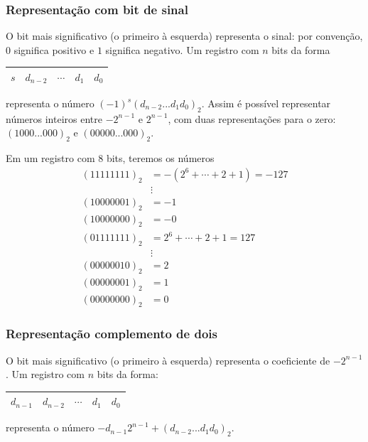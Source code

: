 \subsubsection{Representação com bit de sinal}
O bit mais significativo (o primeiro à esquerda) representa o sinal: por convenção, $0$ significa positivo e $1$ significa negativo. Um registro com $n$ bits da forma
\begin{center}
  \begin{tabular}{|c|c|c|c|c|} \hline
    $s$ & $d_{n-2}$ & $\cdots$ & $d_1$ & $d_0$ \\\hline
  \end{tabular}  
\end{center}
representa o número $(-1)^s(d_{n-2}...d_1d_0)_2$. Assim é possível representar números inteiros entre $-2^{n-1}$ e $2^{n-1}$, com duas representações para o zero: $(1000...000)_2$ e $(00000...000)_2$.

\begin{ex}
Em um registro com $8$ bits, teremos os números
\begin{equation*}
\begin{split}
 (11111111)_2 &= -(2^{6}+\cdots+2+1)=-127\\
 &\vdots    \\
 (10000001)_2 &= -1 \\
 (10000000)_2 &= -0 \\
 (01111111)_2 &= 2^6+\cdots+2+1=127 \\
 &\vdots    \\
 (00000010)_2 &= 2 \\
 (00000001)_2 &= 1 \\
 (00000000)_2 &= 0 
\end{split}  
\end{equation*}
\end{ex}


\subsubsection{Representação complemento de dois}
O bit mais significativo (o primeiro à esquerda) representa o coeficiente de $-2^{n-1}$.  Um registro com $n$ bits da forma:
\begin{center}
  \begin{tabular}{|c|c|c|c|c|} \hline
    $d_{n-1}$ & $d_{n-2}$ & $\cdots$ & $d_1$ & $d_0$\\\hline
  \end{tabular}    
\end{center}
representa o número $-d_{n-1}2^{n-1}+(d_{n-2}...d_1d_0)_2$. 

